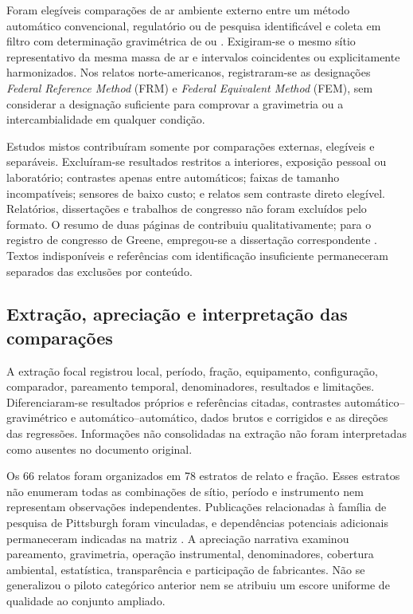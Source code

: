 Foram elegíveis comparações de ar ambiente externo entre um método automático convencional, regulatório ou de pesquisa identificável e coleta em filtro com determinação gravimétrica de \MPdez{} ou \MPdoiscinco{}. Exigiram-se o mesmo sítio representativo da mesma massa de ar e intervalos coincidentes ou explicitamente harmonizados. Nos relatos norte-americanos, registraram-se as designações \textit{Federal Reference Method} (FRM) e \textit{Federal Equivalent Method} (FEM), sem considerar a designação suficiente para comprovar a gravimetria ou a intercambialidade em qualquer condição.

Estudos mistos contribuíram somente por comparações externas, elegíveis e separáveis. Excluíram-se resultados restritos a interiores, exposição pessoal ou laboratório; contrastes apenas entre automáticos; faixas de tamanho incompatíveis; sensores de baixo custo; e relatos sem contraste direto elegível. Relatórios, dissertações e trabalhos de congresso não foram excluídos pelo formato. O resumo de duas páginas de \textcite{rsl033} contribuiu qualitativamente; para o registro de congresso de Greene, empregou-se a dissertação correspondente \parencite{rsl003}. Textos indisponíveis e referências com identificação insuficiente permaneceram separados das exclusões por conteúdo.

\subsection{Extração, apreciação e interpretação das comparações}

A extração focal registrou local, período, fração, equipamento, configuração, comparador, pareamento temporal, denominadores, resultados e limitações. Diferenciaram-se resultados próprios e referências citadas, contrastes automático--gravimétrico e automático--automático, dados brutos e corrigidos e as direções das regressões. Informações não consolidadas na extração não foram interpretadas como ausentes no documento original.

Os 66 relatos foram organizados em 78 estratos de relato e fração. Esses estratos não enumeram todas as combinações de sítio, período e instrumento nem representam observações independentes. Publicações relacionadas à família de pesquisa de Pittsburgh foram vinculadas, e dependências potenciais adicionais permaneceram indicadas na matriz \parencite{rsl086,rsl107}. A apreciação narrativa examinou pareamento, gravimetria, operação instrumental, denominadores, cobertura ambiental, estatística, transparência e participação de fabricantes. Não se generalizou o piloto categórico anterior nem se atribuiu um escore uniforme de qualidade ao conjunto ampliado.

